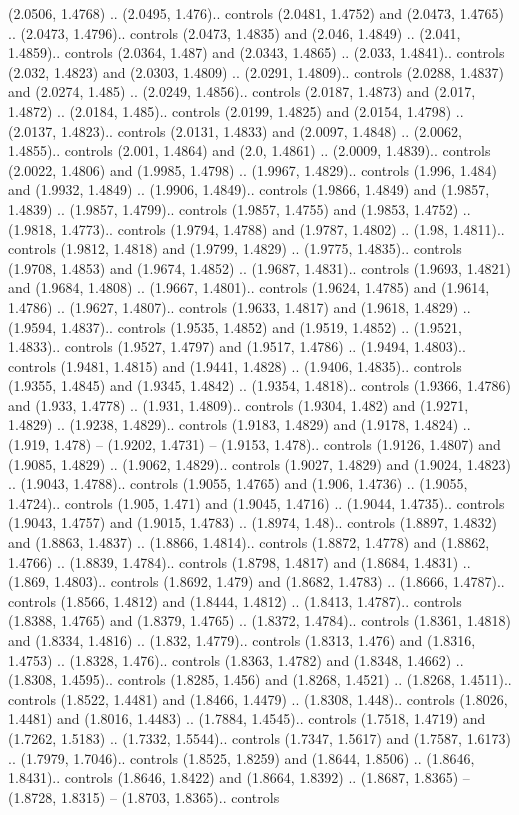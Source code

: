 (2.0506, 1.4768) .. (2.0495, 1.476).. controls (2.0481, 1.4752) and (2.0473, 1.4765) .. (2.0473, 1.4796).. controls (2.0473, 1.4835) and (2.046, 1.4849) .. (2.041, 1.4859).. controls (2.0364, 1.487) and (2.0343, 1.4865) .. (2.033, 1.4841).. controls (2.032, 1.4823) and (2.0303, 1.4809) .. (2.0291, 1.4809).. controls (2.0288, 1.4837) and (2.0274, 1.485) .. (2.0249, 1.4856).. controls (2.0187, 1.4873) and (2.017, 1.4872) .. (2.0184, 1.485).. controls (2.0199, 1.4825) and (2.0154, 1.4798) .. (2.0137, 1.4823).. controls (2.0131, 1.4833) and (2.0097, 1.4848) .. (2.0062, 1.4855).. controls (2.001, 1.4864) and (2.0, 1.4861) .. (2.0009, 1.4839).. controls (2.0022, 1.4806) and (1.9985, 1.4798) .. (1.9967, 1.4829).. controls (1.996, 1.484) and (1.9932, 1.4849) .. (1.9906, 1.4849).. controls (1.9866, 1.4849) and (1.9857, 1.4839) .. (1.9857, 1.4799).. controls (1.9857, 1.4755) and (1.9853, 1.4752) .. (1.9818, 1.4773).. controls (1.9794, 1.4788) and (1.9787, 1.4802) .. (1.98, 1.4811).. controls (1.9812, 1.4818) and (1.9799, 1.4829) .. (1.9775, 1.4835).. controls (1.9708, 1.4853) and (1.9674, 1.4852) .. (1.9687, 1.4831).. controls (1.9693, 1.4821) and (1.9684, 1.4808) .. (1.9667, 1.4801).. controls (1.9624, 1.4785) and (1.9614, 1.4786) .. (1.9627, 1.4807).. controls (1.9633, 1.4817) and (1.9618, 1.4829) .. (1.9594, 1.4837).. controls (1.9535, 1.4852) and (1.9519, 1.4852) .. (1.9521, 1.4833).. controls (1.9527, 1.4797) and (1.9517, 1.4786) .. (1.9494, 1.4803).. controls (1.9481, 1.4815) and (1.9441, 1.4828) .. (1.9406, 1.4835).. controls (1.9355, 1.4845) and (1.9345, 1.4842) .. (1.9354, 1.4818).. controls (1.9366, 1.4786) and (1.933, 1.4778) .. (1.931, 1.4809).. controls (1.9304, 1.482) and (1.9271, 1.4829) .. (1.9238, 1.4829).. controls (1.9183, 1.4829) and (1.9178, 1.4824) .. (1.919, 1.478) -- (1.9202, 1.4731) -- (1.9153, 1.478).. controls (1.9126, 1.4807) and (1.9085, 1.4829) .. (1.9062, 1.4829).. controls (1.9027, 1.4829) and (1.9024, 1.4823) .. (1.9043, 1.4788).. controls (1.9055, 1.4765) and (1.906, 1.4736) .. (1.9055, 1.4724).. controls (1.905, 1.471) and (1.9045, 1.4716) .. (1.9044, 1.4735).. controls (1.9043, 1.4757) and (1.9015, 1.4783) .. (1.8974, 1.48).. controls (1.8897, 1.4832) and (1.8863, 1.4837) .. (1.8866, 1.4814).. controls (1.8872, 1.4778) and (1.8862, 1.4766) .. (1.8839, 1.4784).. controls (1.8798, 1.4817) and (1.8684, 1.4831) .. (1.869, 1.4803).. controls (1.8692, 1.479) and (1.8682, 1.4783) .. (1.8666, 1.4787).. controls (1.8566, 1.4812) and (1.8444, 1.4812) .. (1.8413, 1.4787).. controls (1.8388, 1.4765) and (1.8379, 1.4765) .. (1.8372, 1.4784).. controls (1.8361, 1.4818) and (1.8334, 1.4816) .. (1.832, 1.4779).. controls (1.8313, 1.476) and (1.8316, 1.4753) .. (1.8328, 1.476).. controls (1.8363, 1.4782) and (1.8348, 1.4662) .. (1.8308, 1.4595).. controls (1.8285, 1.456) and (1.8268, 1.4521) .. (1.8268, 1.4511).. controls (1.8522, 1.4481) and (1.8466, 1.4479) .. (1.8308, 1.448).. controls (1.8026, 1.4481) and (1.8016, 1.4483) .. (1.7884, 1.4545).. controls (1.7518, 1.4719) and (1.7262, 1.5183) .. (1.7332, 1.5544).. controls (1.7347, 1.5617) and (1.7587, 1.6173) .. (1.7979, 1.7046).. controls (1.8525, 1.8259) and (1.8644, 1.8506) .. (1.8646, 1.8431).. controls (1.8646, 1.8422) and (1.8664, 1.8392) .. (1.8687, 1.8365) -- (1.8728, 1.8315) -- (1.8703, 1.8365).. controls 